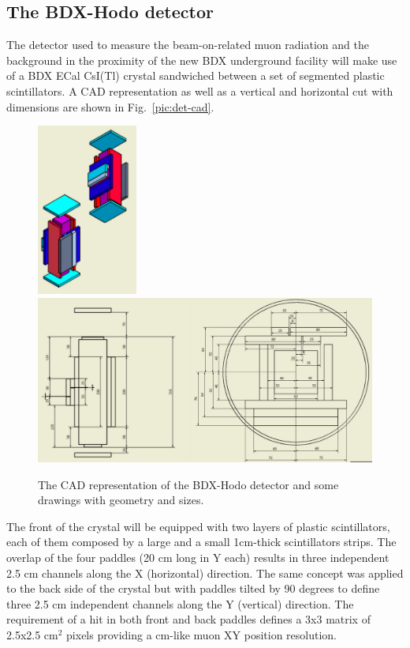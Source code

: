 \subsection{The BDX-Hodo detector}
The detector used to measure the beam-on-related muon radiation and the background in the proximity of the new BDX underground facility will  make use of a BDX ECal CsI(Tl) crystal sandwiched between a set of segmented plastic scintillators.
A CAD representation as well as  a vertical and horizontal  cut with dimensions are shown in Fig.~\ref{pic:det-cad}.
\begin{figure}[h!] 
\center
\includegraphics[width=3.3cm]{figs/det-3d1.pdf}  
\includegraphics[width=11.5cm]{figs/det-3d2.pdf}   
\caption{The CAD representation of the BDX-Hodo detector and some drawings with geometry and sizes.}
\label{fig:det-cad}
\end{figure}
The front of the crystal will be equipped with two  layers of plastic scintillators, each of them composed by  a large and a small 1cm-thick scintillators strips. The overlap of the four paddles (20 cm long in Y each)  results in three independent  2.5 cm channels along the X (horizontal) direction.
The same concept was applied to the  back side of the crystal but with paddles tilted by 90 degrees to define three 2.5 cm independent channels along the Y (vertical) direction. The requirement of a hit in both front and back paddles defines a 3x3 matrix of 2.5x2.5 cm$^2$ pixels providing a cm-like muon XY position resolution. 
